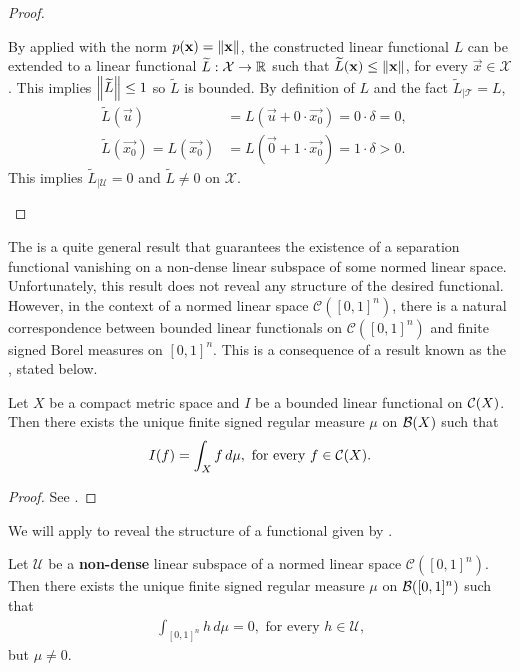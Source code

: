 \begin{proof}
\begin{step}
By  applied with the norm $p(\mathbf{x}) = \left\lVert\mathbf{x}\right\rVert$, the constructed linear functional $L$ can be extended to a linear functional $\widetilde{L} : \mathcal{X} \to {\mathbb R}$ such that $\widetilde{L} (\mathbf{x}) \leq \left\lVert\mathbf{x}\right\rVert$, for every $\vec{x} \in \mathcal{X}$. This implies $\left\lVert\widetilde{L}\right\rVert \leq 1$ so $\widetilde{L}$ is bounded. By definition of $L$ and the fact $\widetilde{L}_{| \mathcal{T}} = L$,
\begin{align*}
    \widetilde{L} (\vec{u})  &= L (\vec{u} + 0 \cdot \vec{x_0}) = 0 \cdot \delta = 0, & \\
    \widetilde{L}(\vec{x_0}) = L (\vec{x_0}) &= L (\vec{0} + 1 \cdot \vec{x_0}) = 1 \cdot \delta > 0.
\end{align*}
This implies $\widetilde{L}_{| \mathcal{U}} = 0$ and $\widetilde{L} \neq 0$ on $\mathcal{X}$.
\end{step}
\end{proof}
The  is a quite general result that guarantees the existence of a separation functional vanishing on a non-dense linear subspace of some normed linear space. Unfortunately, this result does not reveal any structure of the desired functional.
\newpage 
However, in the context of a normed linear space $\mathcal{C}([0,1]^n)$, there is a natural correspondence between bounded linear functionals on  $\mathcal{C}([0,1]^n)$ and finite signed Borel measures on $[0,1]^n$. This is a consequence of a result known as the , stated below.
\begin{theorem*}
Let $X$ be a compact metric space and $I$ be a bounded linear functional on ${\mathcal C}(X)$. Then there exists the unique finite signed regular measure $\mu$ on ${\mathcal B}(X)$ such that
\begin{equation}
    I (f) = \int_{X} f \,d\mu, \text{    for every $f \in {\mathcal C}(X)$}.
\end{equation}
\end{theorem*}
\begin{proof}
See .
\end{proof}
We will apply  to reveal the structure of a functional given by .
\begin{lemma}
\label{lemma:contr}
Let $\mathcal{U}$ be a \textbf{non-dense} linear subspace of a normed linear space $\mathcal{C}([0,1]^n)$.
Then there exists the unique finite signed regular measure $\mu$ on ${\mathcal B}([0,1]^n)$ such that \begin{align*}
    \int_{[0,1]^n} h \, d \mu  = 0, \text{ for every $h \in \mathcal{U}$,}
\end{align*}
but $\mu \neq 0$.
\end{lemma}
